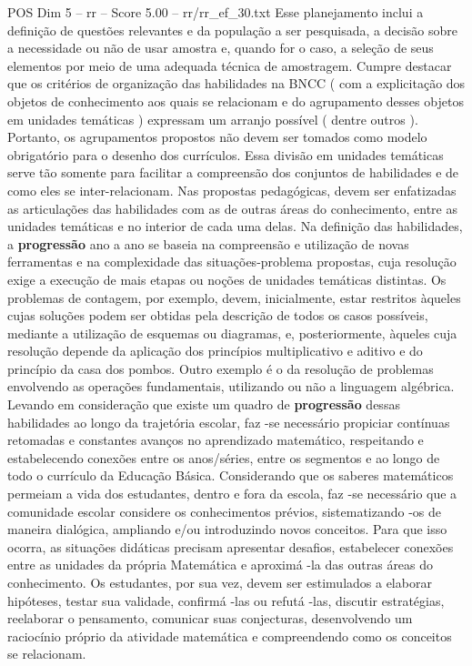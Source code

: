 \begin{textsample}{POS Dim 5 – rr – Score 5.00 – rr/rr\_ef\_30.txt}
Esse planejamento inclui a definição de questões relevantes e da população a ser pesquisada, a decisão sobre a necessidade ou não de usar amostra e, quando for o caso, a seleção de seus elementos por meio de uma adequada técnica de amostragem.
Cumpre destacar que os critérios de organização das habilidades na BNCC ( com a explicitação dos objetos de conhecimento aos quais se relacionam e do agrupamento desses objetos em unidades temáticas ) expressam um arranjo possível ( dentre outros ).
Portanto, os agrupamentos propostos não devem ser tomados como modelo obrigatório para o desenho dos currículos.
Essa divisão em unidades temáticas serve tão somente para facilitar a compreensão dos conjuntos de habilidades e de como eles se inter-relacionam.
Nas propostas pedagógicas, devem ser enfatizadas as articulações das habilidades com as de outras áreas do conhecimento, entre as unidades temáticas e no interior de cada uma delas.
Na definição das habilidades, a \textbf{progressão} ano a ano se baseia na compreensão e utilização de novas ferramentas e na complexidade das situações-problema propostas, cuja resolução exige a execução de mais etapas ou noções de unidades temáticas distintas.
Os problemas de contagem, por exemplo, devem, inicialmente, estar restritos àqueles cujas soluções podem ser obtidas pela descrição de todos os casos possíveis, mediante a utilização de esquemas ou diagramas, e, posteriormente, àqueles cuja resolução depende da aplicação dos princípios multiplicativo e aditivo e do princípio da casa dos pombos.
Outro exemplo é o da resolução de problemas envolvendo as operações fundamentais, utilizando ou não a linguagem algébrica.
Levando em consideração que existe um quadro de \textbf{progressão} dessas habilidades ao longo da trajetória escolar, faz -se necessário propiciar contínuas retomadas e constantes avanços no aprendizado matemático, respeitando e estabelecendo conexões entre os anos/séries, entre os segmentos e ao longo de todo o currículo da Educação Básica.
Considerando que os saberes matemáticos permeiam a vida dos estudantes, dentro e fora da escola, faz -se necessário que a comunidade escolar considere os conhecimentos prévios, sistematizando -os de maneira dialógica, ampliando e/ou introduzindo novos conceitos.
Para que isso ocorra, as situações didáticas precisam apresentar desafios, estabelecer conexões entre as unidades da própria Matemática e aproximá -la das outras áreas do conhecimento.
Os estudantes, por sua vez, devem ser estimulados a elaborar hipóteses, testar sua validade, confirmá -las ou refutá -las, discutir estratégias, reelaborar o pensamento, comunicar suas conjecturas, desenvolvendo um raciocínio próprio da atividade matemática e compreendendo como os conceitos se relacionam.

\end{textsample}
